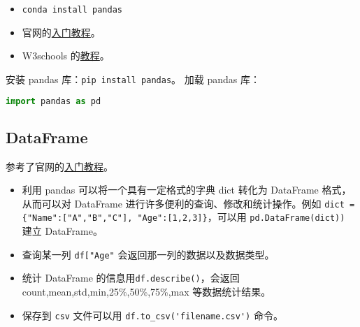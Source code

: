 
\begin{issues}
\issueDraft
\end{issues}

\begin{itemize}
\item \verb|conda install pandas|
\item 官网的\href{https://pandas.pydata.org/docs/getting_started/index.html}{入门教程}。
\item W3schools 的\href{https://www.w3schools.com/python/pandas/default.asp}{教程}。
\end{itemize}
安装 pandas 库：\verb|pip install pandas|。
加载 pandas 库：
\begin{lstlisting}[language=python]
import pandas as pd
\end{lstlisting}
\subsection{DataFrame}
参考了官网的\href{https://pandas.pydata.org/docs/getting_started/index.html}{入门教程}。
\begin{itemize}
\item 
利用 pandas 可以将一个具有一定格式的字典 dict 转化为 DataFrame 格式，从而可以对 DataFrame 进行许多便利的查询、修改和统计操作。例如 \verb|dict = {"Name":["A","B","C"], "Age":[1,2,3]}|，可以用 \verb|pd.DataFrame(dict))| 建立 DataFrame。
\item 查询某一列 \verb|df["Age"| 会返回那一列的数据以及数据类型。
\item 统计 DataFrame 的信息用\verb|df.describe()|，会返回 count,mean,std,min,25\%,50\%,75\%,max 等数据统计结果。
\item 保存到 \verb|csv| 文件可以用 \verb|df.to_csv('filename.csv')| 命令。
\end{itemize}
